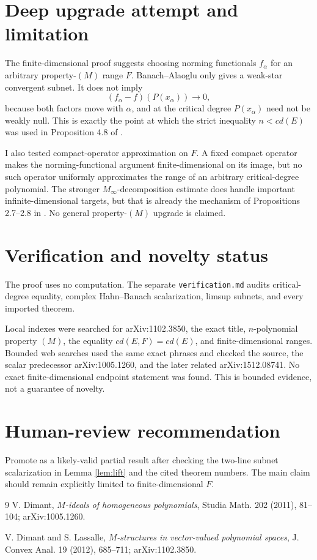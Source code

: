 \documentclass[11pt]{article}
\begin{document}
\section{Deep upgrade attempt and limitation}

The finite-dimensional proof suggests choosing norming functionals
\(f_\alpha\) for an arbitrary property-\((M)\) range \(F\). Banach--Alaoglu
only gives a weak-star convergent subnet. It does not imply
\[
 (f_\alpha-f)(P(x_\alpha))\longrightarrow0,
\]
because both factors move with \(\alpha\), and at the critical degree
\(P(x_\alpha)\) need not be weakly null. This is exactly the point at which
the strict inequality \(n<cd(E)\) was used in Proposition 4.8 of \cite{DL}.

I also tested compact-operator approximation on \(F\). A fixed compact
operator makes the norming-functional argument finite-dimensional on its
image, but no such operator uniformly approximates the range of an arbitrary
critical-degree polynomial. The stronger \(M_\infty\)-decomposition estimate
does handle important infinite-dimensional targets, but that is already the
mechanism of Propositions 2.7--2.8 in \cite{DL}. No general property-\((M)\)
upgrade is claimed.

\section{Verification and novelty status}

The proof uses no computation. The separate \texttt{verification.md} audits
critical-degree equality, complex Hahn--Banach scalarization, limsup subnets,
and every imported theorem.

Local indexes were searched for arXiv:1102.3850, the exact title,
\(n\)-polynomial property \((M)\), the equality \(cd(E,F)=cd(E)\), and
finite-dimensional ranges. Bounded web searches used the same exact phrases
and checked the source, the scalar predecessor arXiv:1005.1260, and the later
related arXiv:1512.08741. No exact finite-dimensional endpoint statement was
found. This is bounded evidence, not a guarantee of novelty.

\section*{Human-review recommendation}

Promote as a likely-valid partial result after checking the two-line subnet
scalarization in Lemma \ref{lem:lift} and the cited theorem numbers. The main
claim should remain explicitly limited to finite-dimensional \(F\).

\begin{thebibliography}{9}
V. Dimant,
\emph{\(M\)-ideals of homogeneous polynomials},
Studia Math. 202 (2011), 81--104;
arXiv:1005.1260.

V. Dimant and S. Lassalle,
\emph{\(M\)-structures in vector-valued polynomial spaces},
J. Convex Anal. 19 (2012), 685--711;
arXiv:1102.3850.
\end{thebibliography}
\end{document}
